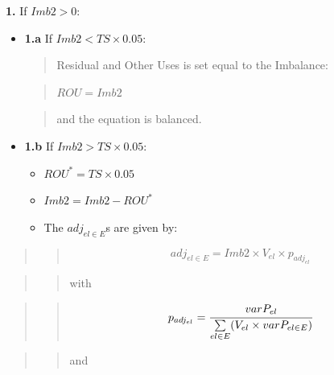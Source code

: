 \documentclass[]{article}
\providecommand{\tightlist}{%
  \setlength{\itemsep}{0pt}\setlength{\parskip}{0pt}}
\begin{document}
\textbf{1.} If \(Imb2 > 0\):

\begin{itemize}
\item
  \textbf{1.a} If \(Imb2 < TS \times 0.05\):

  \begin{quote}
  Residual and Other Uses is set equal to the Imbalance:
  \end{quote}

  \begin{quote}
  \(ROU = Imb2\)
  \end{quote}

  \begin{quote}
  and the equation is balanced.
  \end{quote}
\item
  \textbf{1.b} If \(Imb2 > TS \times 0.05\):

  \begin{itemize}
  \tightlist
  \item
    \(ROU^* = TS \times 0.05\)
  \item
    \(Imb2 = Imb2 - ROU^*\)
  \item
    The \emph{\(adj_{el \in E}\)}s are given by:
  \end{itemize}
\end{itemize}

\begin{quote}
\begin{quote}
\begin{equation}
\label{eq:badj1}
adj_{el \in E} = Imb2 \times V_{el} \times p_{adj_{el}}
\end{equation}
\end{quote}
\end{quote}

\begin{quote}
\begin{quote}
with
\end{quote}
\end{quote}

\begin{quote}
\begin{quote}
\begin{equation}
\label{eq:badj2}
p_{adj_{el}} =\cfrac{varP_{el}}{\sum \limits_{el \in E} (V_{el} \times varP_{el \in E})}
\end{equation}
\end{quote}
\end{quote}

\begin{quote}
\begin{quote}
and
\end{quote}
\end{quote}
\end{document}
